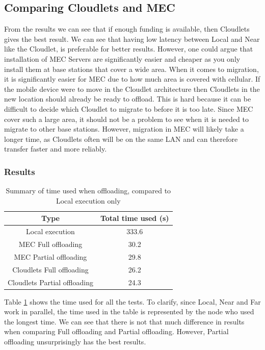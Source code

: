 
\subsection{Comparing Cloudlets and MEC}
From the results we can see that if enough funding is available, then Cloudlets gives the best result. We can see that having low latency between Local and Near like the Cloudlet, is preferable for better results. However, one could argue that installation of MEC Servers are significantly easier and cheaper as you only install them at base stations that cover a wide area. When it comes to migration, it is significantly easier for MEC due to how much area is covered with cellular. If the mobile device were to move in the Cloudlet architecture then Cloudlets in the new location should already be ready to offload. This is hard because it can be difficult to decide which Cloudlet to migrate to before it is too late. Since MEC cover such a large area, it should not be a problem to see when it is needed to migrate to other base stations. However, migration in MEC will likely take a longer time, as Cloudlets often will be on the same LAN and can therefore transfer faster and more reliably.




\subsubsection{Results}

\begin{table}[]
    \centering
    \begin{tabular}{|c|c|}
        \hline
       Type  & Total time used (s)\\
       \hline
       \hline
       Local execution                         & 333.6  \\
       \hline
       MEC Full offloading       & 30.2 \\
       \hline
       MEC Partial offloading    & 29.8 \\
       \hline
       Cloudlets Full offloading & 26.2 \\
       \hline
       Cloudlets Partial offloading  & 24.3 \\
       \hline
    \end{tabular}
    \caption{Summary of time used when offloading, compared to Local execution only}
    \label{tab:total_time_compare}
\end{table}
Table \ref{tab:total_time_compare} shows the time used for all the tests. To clarify, since Local, Near and Far work in parallel, the time used in the table is represented by the node who used the longest time. We can see that there is not that much difference in results when comparing Full offloading and Partial offloading. However, Partial offloading unsurprisingly has the best results.

